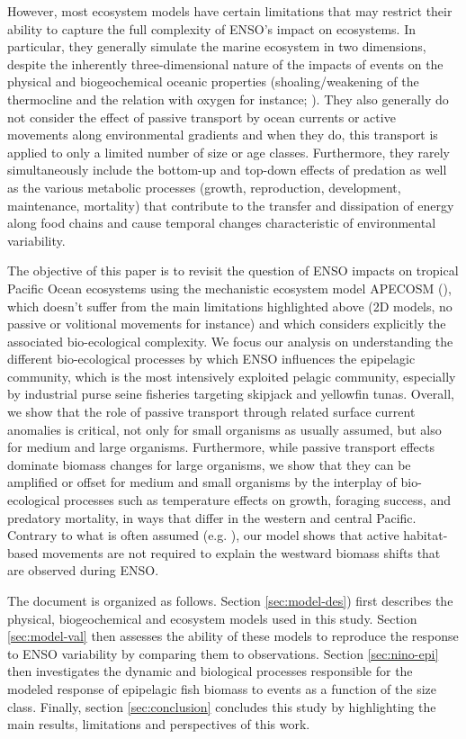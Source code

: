 However, most ecosystem models have certain limitations that may restrict their ability to capture the full complexity of ENSO's impact on ecosystems. In particular, they generally simulate the marine ecosystem in two dimensions, despite the  inherently three-dimensional nature of the impacts of \nino{} events on the physical and biogeochemical oceanic properties  (shoaling/weakening of the thermocline and the relation with oxygen for instance; \citealp{leungENSODrivesNearsurface2019}). They also generally do not consider the effect of passive transport by ocean currents or active movements along environmental gradients and when they do, this transport is applied  to only a limited number of size or age classes. Furthermore, they rarely simultaneously include  the bottom-up and top-down effects of predation as well as the various metabolic processes (growth, reproduction, development, maintenance, mortality) that contribute to the transfer and dissipation of energy along food chains and cause temporal changes characteristic of environmental variability. 

The objective of this paper is to revisit the question of ENSO impacts on tropical Pacific Ocean ecosystems using the mechanistic ecosystem model APECOSM (\citealp{mauryOverviewAPECOSMSpatialized2010}), which doesn't suffer from the main limitations highlighted above (2D models, no passive or volitional movements for instance) and which considers explicitly the associated bio-ecological complexity. We focus our analysis on understanding the different bio-ecological processes by which ENSO influences the epipelagic community, which is  the most intensively exploited pelagic community, especially by industrial purse seine fisheries targeting skipjack and yellowfin tunas. Overall, we show that the role of passive transport through \nino{} related surface current anomalies is critical, not only for small organisms as usually assumed, but also for medium and large organisms. Furthermore, while passive transport effects dominate biomass changes for large organisms, we show that they can be amplified or offset for medium and small organisms by the interplay of bio-ecological processes such as temperature effects on growth, foraging success, and predatory mortality, in ways that differ in the western and central Pacific. Contrary to what is often assumed (e.g. \citealt{lehodeyPelagicEcosystemTropical2001, lehodeyENSOImpactMarine2020}), our model shows that active habitat-based movements are not required to explain the westward biomass shifts that are observed during ENSO.

The document is organized as follows. Section \ref{sec:model-des}) first describes the physical, biogeochemical and ecosystem models used in this study. Section \ref{sec:model-val} then assesses the ability of these models to reproduce the response to ENSO variability by comparing them to observations. Section \ref{sec:nino-epi} then investigates the dynamic and biological processes responsible for the modeled response of epipelagic fish biomass to \nino{} events as a function of the size class. Finally, section \ref{sec:conclusion} concludes this study by highlighting the main results, limitations and perspectives of this work. 
